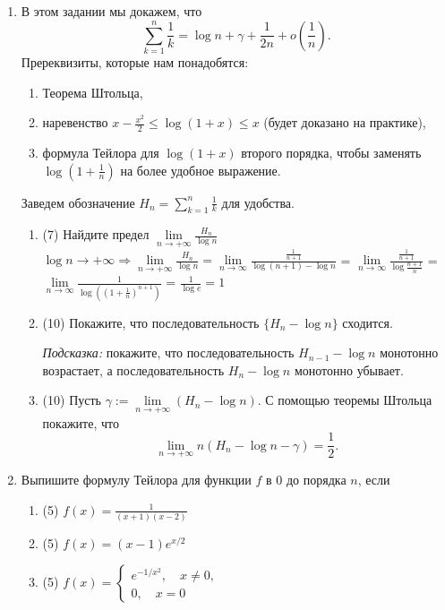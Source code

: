 \documentclass[a4paper]{article}
\begin{document}
\renewcommand{\labelenumii}{\arabic{enumii})}
\renewcommand{\labelenumiii}{\roman{enumiii})}




\begin{enumerate}
    
    \item В этом задании мы докажем, что 
    \[
        \sum\limits_{k = 1}^n \frac{1}{k} = \log n + \gamma + \frac{1}{2n} + o\left( \frac{1}{n} \right).
    \]
    Пререквизиты, которые нам понадобятся:
    \begin{enumerate}[label=(\arabic*)]
        \item Теорема Штольца,
        \item наревенство $x-\frac{x^2}{2}\leq \log (1+x)\leq x$ (будет доказано на практике),
        \item формула Тейлора для $\log(1+x)$ второго порядка, чтобы заменять $\log\left(1 + \frac{1}{n}\right)$ на более удобное выражение.
    \end{enumerate}
    Заведем обозначение $H_n = \sum\limits_{k = 1}^n \frac{1}{k}$ для удобства.
    \begin{enumerate}
        \item (7) Найдите предел $\lim\limits_{n\to +\infty}\frac{H_n}{\log n}$\\
        $\log n \to +\infty \Rightarrow \lim\limits_{n\to +\infty}\frac{H_n}{\log n} = \lim\limits_{n\to\infty} \frac{\frac{1}{n+1}}{\log (n+1) - \log n}$ 
        = $\lim\limits_{n\to\infty} \frac{\frac{1}{n+1}}{\log \frac{n+1}{n}}$ = 
        $\lim\limits_{n\to\infty} \frac{1}{\log ((1 + \frac{1}{n})^{n+1})}$ = 
        $\frac{1}{\log e} = 1$
        \item (10) Покажите, что последовательность $\{H_n - \log n\}$ сходится.
        
        \noindent\emph{Подсказка:} покажите, что последовательность $H_{n-1} - \log n$ монотонно возрастает, а последовательность $H_n - \log n$ монотонно убывает.
        
        \item (10) Пусть $\gamma:= \lim\limits_{n\to +\infty} (H_n - \log n)$. С помощью теоремы Штольца покажите, что
        \[
            \lim\limits_{n\to +\infty}n(H_n - \log n - \gamma) = \frac{1}{2}.
        \]
    \end{enumerate}
    
    \item Выпишите формулу Тейлора для функции $f$ в $0$ до порядка $n$, если
    \begin{enumerate}
        \item (5) $f(x) = \frac{1}{(x+1)(x-2)}$
        \item (5) $f(x) = (x-1)e^{x/2}$
        \item (5) $f(x) = \begin{cases}e^{-1/x^2},\quad x\neq 0,\\ 0,\quad x=0\end{cases}$
    \end{enumerate}
    

\end{enumerate}
\end{document}
